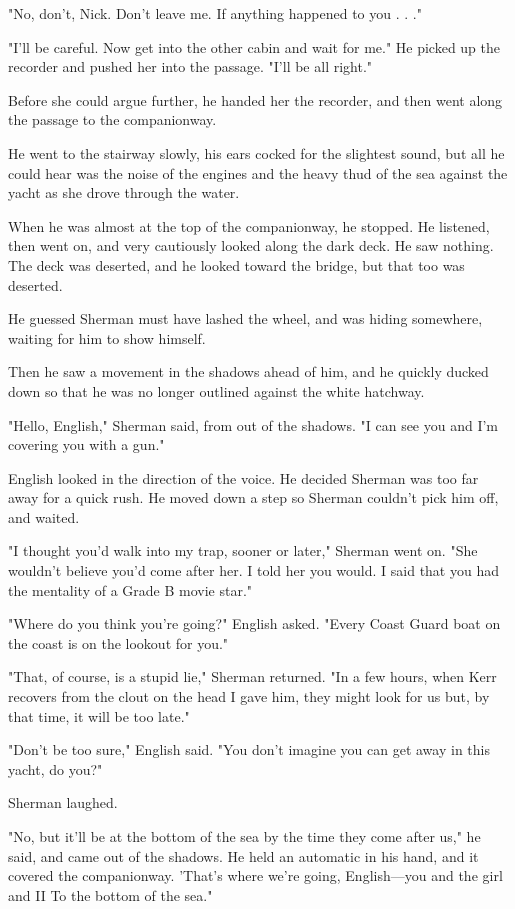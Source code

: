 \documentclass{novel}
\begin{document}
"No, don't, Nick. Don't leave me. If anything happened to you . . ."

"I'll be careful. Now get into the other cabin and wait for me." He picked up the recorder and pushed her into the passage. "I'll be all right."

Before she could argue further, he handed her the recorder, and then went along the passage to the companionway.

He went to the stairway slowly, his ears cocked for the slightest sound, but all he could hear was the noise of the engines and the heavy thud of the sea against the yacht as she drove through the water.

When he was almost at the top of the companionway, he stopped. He listened, then went on, and very cautiously looked along the dark deck. He saw nothing. The deck was deserted, and he looked toward the bridge, but that too was deserted.

He guessed Sherman must have lashed the wheel, and was hiding somewhere, waiting for him to show himself.

Then he saw a movement in the shadows ahead of him, and he quickly ducked down so that he was no longer outlined against the white hatchway.

"Hello, English," Sherman said, from out of the shadows. "I can see you and I'm covering you with a gun."

English looked in the direction of the voice. He decided Sherman was too far away for a quick rush. He moved down a step so Sherman couldn't pick him off, and waited.

"I thought you'd walk into my trap, sooner or later," Sherman went on. "She wouldn't believe you'd come after her. I told her you would. I said that you had the mentality of a Grade B movie star."

"Where do you think you're going?" English asked. "Every Coast Guard boat on the coast is on the lookout for you."

"That, of course, is a stupid lie," Sherman returned. "In a few hours, when Kerr recovers from the clout on the head I gave him, they might look for us but, by that time, it will be too late."

"Don't be too sure," English said. "You don't imagine you can get away in this yacht, do you?"

Sherman laughed.

"No, but it'll be at the bottom of the sea by the time they come after us," he said, and came out of the shadows. He held an automatic in his hand, and it covered the companionway. 'That's where we're going, English—you and the girl and II To the bottom of the sea."
\end{document}
